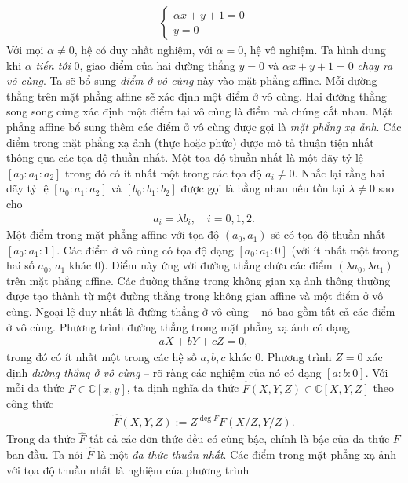 \begin{multicols}{2}
\begin{align*}
\begin{cases}
			\alpha x+y+1 =0\\
			y=0
		\end{cases}
	\end{align*}
	Với mọi $\alpha\neq 0$, hệ có duy nhất nghiệm, với $\alpha=0$, hệ vô nghiệm. 
	\vskip 0.1cm
	Ta hình dung khi $\alpha$ {\em tiến tới} $0$, giao điểm của hai đường thẳng $y=0$ và $\alpha x+y+1=0$ {\em chạy ra vô cùng}. Ta sẽ bổ sung {\em điểm ở vô cùng} này vào mặt phẳng affine. Mỗi đường thẳng trên mặt phẳng affine sẽ xác định một điểm ở vô cùng. Hai đường thẳng song song cùng xác định một điểm tại vô cùng là điểm mà chúng cắt nhau. 
	\vskip 0.1cm
	Mặt phẳng affine bổ sung thêm các điểm ở vô cùng được gọi là {\em mặt phẳng xạ ảnh}. Các điểm trong mặt phẳng xạ ảnh (thực hoặc phức) được mô tả thuận tiện nhất thông qua các tọa độ thuần nhất. Một tọa độ thuần nhất là một dãy tỷ lệ $[a_0:a_1:a_2]$ trong đó có ít nhất một trong các tọa độ $a_i\neq 0$. Nhắc lại rằng hai dãy tỷ lệ $[a_0:a_1:a_2]$ và $[b_0:b_1:b_2]$ được gọi là bằng nhau nếu tồn tại $\lambda\neq 0$ sao cho
	\begin{align*}
		a_i=\lambda b_i, \quad i=0,1,2.
	\end{align*}
	Một điểm trong mặt phẳng affine với tọa độ $(a_0,a_1)$ sẽ có tọa độ thuần nhất $[a_0:a_1:1]$. Các điểm ở vô cùng có tọa độ dạng $[a_0:a_1:0]$ (với ít nhất một trong hai số $a_0$, $a_1$ khác $0$). Điểm này ứng với đường thẳng chứa các điểm $(\lambda a_0,\lambda a_1)$ trên mặt phẳng affine. 
	\vskip 0.1cm	
	Các đường thẳng trong không gian xạ ảnh thông thường được tạo thành từ một đường thẳng trong không gian affine và một điểm ở vô cùng. Ngoại lệ duy nhất là đường thẳng ở vô cùng -- nó bao gồm tất cả các điểm ở vô cùng.
	Phương trình đường thẳng trong mặt phẳng xạ ảnh có dạng
	\begin{align*}
		aX+bY+cZ=0,
	\end{align*}
	trong đó có ít nhất một trong các hệ số $a,b,c$ khác $0$. Phương trình
	$Z=0$ 
	xác định {\em đường thẳng ở vô cùng} -- rõ ràng các nghiệm của nó có dạng $[a:b:0]$.
	\vskip 0.1cm
	Với mỗi đa thức $F\in \mathbb C[x,y]$, ta định nghĩa đa thức $\widehat F(X,Y,Z)\in \mathbb C[X,Y,Z]$ theo công thức
	\begin{align*}
		\widehat F(X,Y,Z):=Z^{\deg F}F(X/Z,Y/Z).
	\end{align*}
	Trong đa thức $\widehat F$ tất cả các đơn thức đều có cùng bậc, chính là bậc của đa thức $ F$ ban đầu. Ta nói $\widehat F$ là một {\em đa thức thuần nhất}. 
	Các điểm trong mặt phẳng xạ ảnh với tọa độ thuần nhất là nghiệm của phương trình
	\begin{align*}

\end{align*}
\end{multicols}
